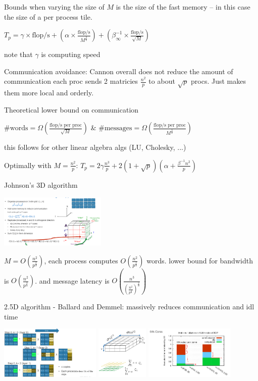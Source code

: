 \documentclass[letter,8pt,landscape]{article}
\begin{document}
\begin{multicols}{3}
  Bounds when varying the size of $M$ is the size of the fast memory -- in this
  case the size of a per process tile.

  $T_p = \gamma \times \text{flop/s} + (\alpha \times
  \frac{\text{flop/s}}{M^{\frac{3}{2}}}) + (\beta^{-1}_\infty \times
  \frac{\text{flop/s}}{\sqrt{M}})$
  
  note that $\gamma$ is computing speed

  Communication avoidance: Cannon  overall does not reduce the amount of
  communication each proc sends 2 matricies $\frac{n^2}{p}$ to about $\sqrt{p}$
  procs. Just makes them more local and orderly. 

  Theoretical lower bound on communication 
  
  $ \# \text{words} = \Omega(\frac{\text{flop/s per proc}}{\sqrt{M}}) $ \&
  $ \# \text{messages} = \Omega(\frac{\text{flop/s per proc}}{M^{\frac{3}{2}}})$

  this follows for other linear algebra algs (LU, Cholesky, ...)


  Optimally with $M = \frac{n^2}{p}$: 
  $T_p = 2\gamma\frac{n^3}{p} + 2(1+\sqrt{p})(\alpha + \frac{\beta^{-1}n^2}{p})$
  

  Johnson’s 3D algorithm
  \begin{center}
    \includegraphics[width=2in]{images/johnson.jpg}
  \end{center}
  $M = O(\frac{n^2}{p^{\frac{2}{3}}})$, each process computes
  $O(\frac{n^2}{p^{\frac{2}{3}}})$ words. lower bound for bandwidth is
  $O(\frac{n^2}{p^{\frac{2}{3}}})$. and message latency is
  $O(\frac{n^3}{(\frac{n^2}{p^{\frac{2}{3}}})^{\frac{2}{3}}})$

  2.5D algorithm - Ballard and Demmel:  massively reduces communication and idl
  time
  \begin{center}
    \includegraphics[height=1in]{images/2-5d-circular.jpg}
    \includegraphics[height=1in]{images/2-5d-grid.jpg}
    \includegraphics[height=1in]{images/2-5d-big.jpg}
  \end{center}


\end{multicols}
\end{document}
